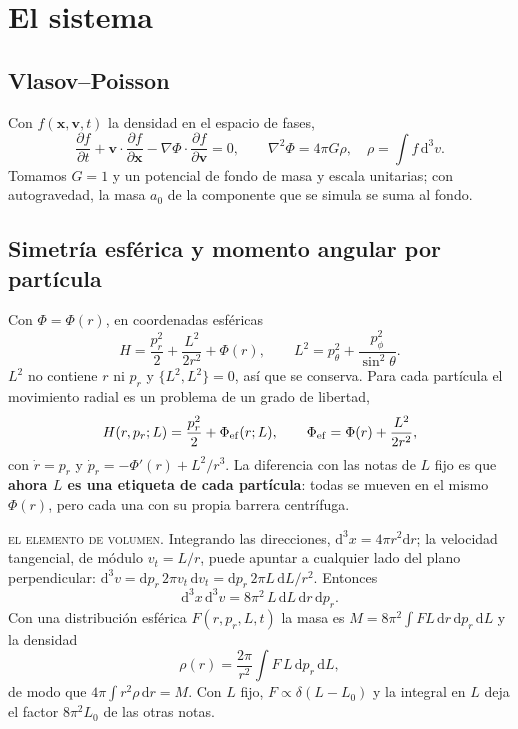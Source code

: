 \documentclass[11pt,a4paper]{article}
\newcommand{\dd}{\mathrm{d}}
\begin{document}
\section{El sistema}
\label{sec:sistema}

\subsection{Vlasov--Poisson}

Con $f(\mathbf{x},\mathbf{v},t)$ la densidad en el espacio de fases,
\begin{equation}
  \frac{\partial f}{\partial t}+\mathbf{v}\cdot\frac{\partial f}{\partial\mathbf{x}}
  -\nabla\Phi\cdot\frac{\partial f}{\partial\mathbf{v}}=0,
  \qquad
  \nabla^2\Phi=4\pi G\rho,\quad \rho=\int f\,\dd^3v .
  \label{eq:vlasov}
\end{equation}
Tomamos $G=1$ y un potencial de fondo de masa y escala unitarias; con autogravedad, la
masa $a_0$ de la componente que se simula se suma al fondo.

\subsection{Simetría esférica y momento angular por partícula}

Con $\Phi=\Phi(r)$, en coordenadas esféricas
\begin{equation}
  H=\frac{p_r^2}{2}+\frac{L^2}{2r^2}+\Phi(r),
  \qquad L^2=p_\theta^2+\frac{p_\phi^2}{\sin^2\theta}.
  \label{eq:hesferico}
\end{equation}
$L^2$ no contiene $r$ ni $p_r$ y $\{L^2,L^2\}=0$, así que se conserva. Para cada
partícula el movimiento radial es un problema de un grado de libertad,
\begin{equation}
  H(r,p_r;L)=\frac{p_r^2}{2}+\Phi_{\rm ef}(r;L),
  \qquad \Phi_{\rm ef}=\Phi(r)+\frac{L^2}{2r^2},
  \label{eq:hamiltoniano}
\end{equation}
con $\dot r=p_r$ y $\dot p_r=-\Phi'(r)+L^2/r^3$. La diferencia con las notas de $L$ fijo
es que \textbf{ahora $L$ es una etiqueta de cada partícula}: todas se mueven en el mismo
$\Phi(r)$, pero cada una con su propia barrera centrífuga.

\begin{aviso}
\textsc{el elemento de volumen.} Integrando las direcciones, $\dd^3x=4\pi r^2\dd r$; la
velocidad tangencial, de módulo $v_t=L/r$, puede apuntar a cualquier lado del plano
perpendicular: $\dd^3v=\dd p_r\,2\pi v_t\,\dd v_t=\dd p_r\,2\pi L\,\dd L/r^2$. Entonces
\begin{equation}
  \dd^3x\,\dd^3v=8\pi^2\,L\,\dd L\,\dd r\,\dd p_r .
  \label{eq:medida}
\end{equation}
Con una distribución esférica $F(r,p_r,L,t)$ la masa es $M=8\pi^2\int FL\,\dd r\,\dd
p_r\,\dd L$ y la densidad
\begin{equation}
  \rho(r)=\frac{2\pi}{r^2}\int F\,L\,\dd p_r\,\dd L,
  \label{eq:densidad}
\end{equation}
de modo que $4\pi\int r^2\rho\,\dd r=M$. Con $L$ fijo, $F\propto\delta(L-L_0)$ y la
integral en $L$ deja el factor $8\pi^2L_0$ de las otras notas.
\end{aviso}
\end{document}
